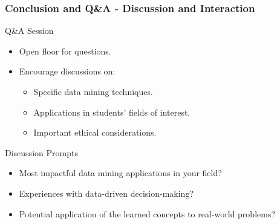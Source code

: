 \documentclass[aspectratio=169]{beamer}
\begin{document}
\begin{frame}[fragile]
    \frametitle{Conclusion and Q\&A - Discussion and Interaction}
    \begin{block}{Q\&A Session}
        \begin{itemize}
            \item Open floor for questions.
            \item Encourage discussions on:
            \begin{itemize}
                \item Specific data mining techniques.
                \item Applications in students' fields of interest.
                \item Important ethical considerations.
            \end{itemize}
        \end{itemize}
    \end{block}

    \begin{block}{Discussion Prompts}
        \begin{itemize}
            \item Most impactful data mining applications in your field?
            \item Experiences with data-driven decision-making?
            \item Potential application of the learned concepts to real-world problems?
        \end{itemize}
    \end{block}
\end{frame}
\end{document}
